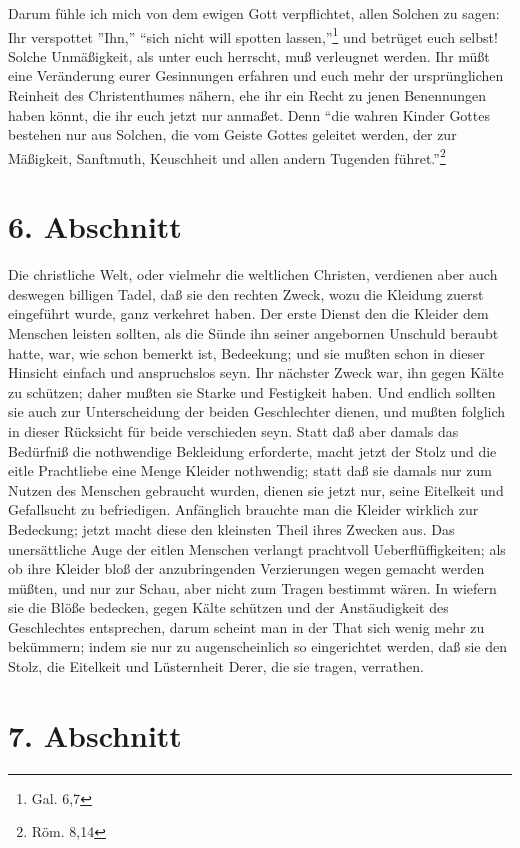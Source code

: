 Darum fühle ich mich von dem ewigen Gott verpflichtet, allen Solchen zu sagen: Ihr verspottet ''Ihn,'' "`sich nicht will spotten lassen,"'\footnote{Gal. 6,7} und betrüget euch selbst! Solche Unmäßigkeit, als unter euch herrscht, muß verleugnet werden. Ihr müßt eine Veränderung eurer Gesinnungen erfahren und euch mehr der ursprünglichen Reinheit des Christenthumes nähern, ehe ihr ein Recht zu jenen Benennungen haben könnt, die ihr euch jetzt nur anmaßet. Denn "`die wahren Kinder Gottes bestehen nur aus Solchen, die vom Geiste Gottes geleitet werden, der zur Mäßigkeit, Sanftmuth, Keuschheit und allen andern Tugenden führet."'\footnote{Röm. 8,14}

\section{6. Abschnitt}

Die christliche Welt, oder vielmehr die weltlichen Christen, verdienen aber auch deswegen billigen Tadel, daß sie den rechten Zweck, wozu die Kleidung zuerst eingeführt wurde, ganz verkehret haben. Der erste Dienst den die Kleider dem Menschen leisten sollten, als die Sünde ihn seiner angebornen Unschuld beraubt hatte, war, wie schon bemerkt ist, Bedeekung; und sie mußten schon in dieser Hinsicht einfach und anspruchslos seyn. Ihr nächster Zweck war, ihn gegen Kälte zu schützen; daher mußten sie Starke und Festigkeit haben. Und endlich sollten sie auch zur Unterscheidung der beiden Geschlechter dienen, und mußten folglich in dieser Rücksicht für beide verschieden seyn. Statt daß aber damals das Bedürfniß die nothwendige Bekleidung erforderte, macht jetzt der Stolz und die eitle Prachtliebe eine Menge Kleider nothwendig; statt daß sie damals nur zum Nutzen des Menschen gebraucht wurden, dienen sie jetzt nur, seine Eitelkeit und Gefallsucht zu befriedigen. Anfänglich brauchte man die Kleider wirklich zur Bedeckung; jetzt macht diese den kleinsten Theil ihres Zwecken aus. Das unersättliche Auge der eitlen Menschen verlangt prachtvoll Ueberflüffigkeiten; als ob ihre Kleider bloß der anzubringenden Verzierungen wegen gemacht werden müßten, und nur zur Schau, aber nicht zum Tragen bestimmt wären. In wiefern sie die Blöße bedecken, gegen Kälte schützen und der Anstäudigkeit des Geschlechtes entsprechen, darum scheint man in der That sich wenig mehr zu bekümmern; indem sie nur zu augenscheinlich so eingerichtet werden, daß sie den Stolz, die Eitelkeit und Lüsternheit Derer, die sie tragen, verrathen.

\section{7. Abschnitt}

